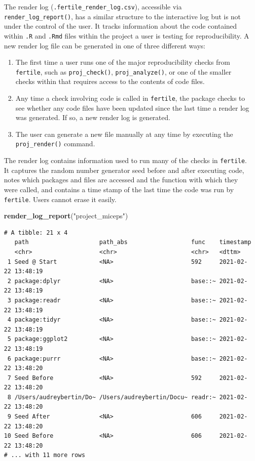 \documentclass[12pt,twoside]{reedthesis}
\newenvironment{Shaded}{\begin{snugshade}}{\end{snugshade}}
\newcommand{\KeywordTok}[1]{\textcolor[rgb]{0.13,0.29,0.53}{\textbf{#1}}}
\newcommand{\NormalTok}[1]{#1}
\newcommand{\StringTok}[1]{\textcolor[rgb]{0.31,0.60,0.02}{#1}}
\begin{document}
The render log (\texttt{.fertile\_render\_log.csv}), accessible via \texttt{render\_log\_report()}, has a similar structure to the interactive log but is not under the control of the user. It tracks information about the code contained within \texttt{.R} and \texttt{.Rmd} files within the project a user is testing for reproducibility. A new render log file can be generated in one of three different ways:
\begin{enumerate}
\def\labelenumi{\arabic{enumi}.}
\item
  The first time a user runs one of the major reproducibility checks from \texttt{fertile}, such as \texttt{proj\_check()}, \texttt{proj\_analyze()}, or one of the smaller checks within that requires access to the contents of code files.
\item
  Any time a check involving code is called in \texttt{fertile}, the package checks to see whether any code files have been updated since the last time a render log was generated. If so, a new render log is generated.
\item
  The user can generate a new file manually at any time by executing the \texttt{proj\_render()} command.
\end{enumerate}
The render log contains information used to run many of the checks in \texttt{fertile}. It captures the random number generator seed before and after executing code, notes which packages and files are accessed and the function with which they were called, and contains a time stamp of the last time the code was run by \texttt{fertile}. Users cannot erase it easily.
\begin{Shaded}
\begin{Highlighting}[]
\KeywordTok{render_log_report}\NormalTok{(}\StringTok{"project_miceps"}\NormalTok{)}
\end{Highlighting}
\end{Shaded}
\footnotesize
\begin{verbatim}
# A tibble: 21 x 4
   path                    path_abs                  func    timestamp          
   <chr>                   <chr>                     <chr>   <dttm>             
 1 Seed @ Start            <NA>                      592     2021-02-22 13:48:19
 2 package:dplyr           <NA>                      base::~ 2021-02-22 13:48:19
 3 package:readr           <NA>                      base::~ 2021-02-22 13:48:19
 4 package:tidyr           <NA>                      base::~ 2021-02-22 13:48:19
 5 package:ggplot2         <NA>                      base::~ 2021-02-22 13:48:19
 6 package:purrr           <NA>                      base::~ 2021-02-22 13:48:20
 7 Seed Before             <NA>                      592     2021-02-22 13:48:20
 8 /Users/audreybertin/Do~ /Users/audreybertin/Docu~ readr:~ 2021-02-22 13:48:20
 9 Seed After              <NA>                      606     2021-02-22 13:48:20
10 Seed Before             <NA>                      606     2021-02-22 13:48:20
# ... with 11 more rows
\end{verbatim}
\normalsize
\end{document}
